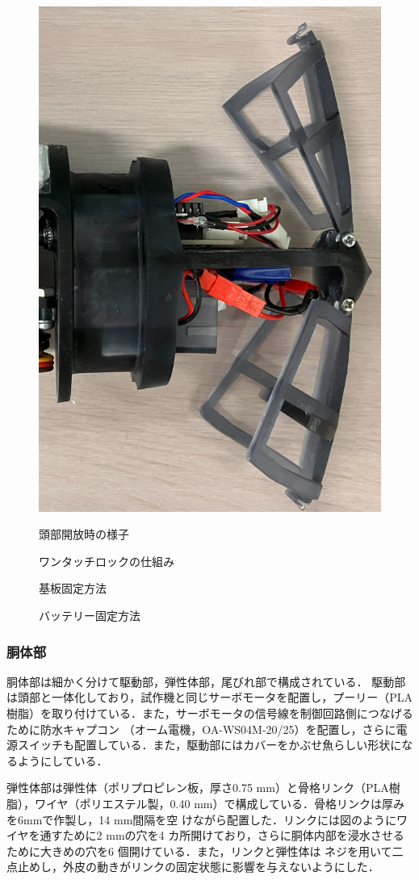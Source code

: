 \begin{figure}[t]
    \centering
    \begin{minipage}[b]{0.3\linewidth}
        \centering
        \includegraphics[width=0.6\linewidth]{chapters/picture/open_head.jpg}
        \caption{頭部開放時の様子}
        \label{fig:head_open}
    \end{minipage}
    \begin{minipage}[b]{0.5\linewidth}
        \centering
        \caption{ワンタッチロックの仕組み}
        \label{fig:rock}
    \end{minipage}
\end{figure}
\begin{figure}[t]
    \centering
    \begin{minipage}[b]{0.4\linewidth}
        \centering
        \caption{基板固定方法}
        \label{fig:toubu_kiban}
    \end{minipage}
    \hspace{0.1\linewidth}
    \begin{minipage}[b]{0.4\linewidth}
        \centering
        \caption{バッテリー固定方法}
        \label{fig:toubu_battery}
    \end{minipage}
\end{figure}

\subsubsection{胴体部}
胴体部は細かく分けて駆動部，弾性体部，尾びれ部で構成されている．
駆動部は頭部と一体化しており，試作機と同じサーボモータを配置し，プーリー（PLA樹脂）を取り付けている．また，サーボモータの信号線を制御回路側につなげるために防水キャプコン
（オーム電機，OA-WS04M-20/25）を配置し，さらに電源スイッチも配置している．また，駆動部にはカバーをかぶせ魚らしい形状になるようにしている．



弾性体部は弾性体（ポリプロピレン板，厚さ0.75 mm）と骨格リンク（PLA樹脂），ワイヤ（ポリエステル製，0.40 mm）で構成している．骨格リンクは厚みを6mmで作製し，14 mm間隔を空
けながら配置した．リンクには図のようにワイヤを通すために2 mmの穴を4 カ所開けており，さらに胴体内部を浸水させるために大きめの穴を6 個開けている．また，リンクと弾性体は
ネジを用いて二点止めし，外皮の動きがリンクの固定状態に影響を与えないようにした．

